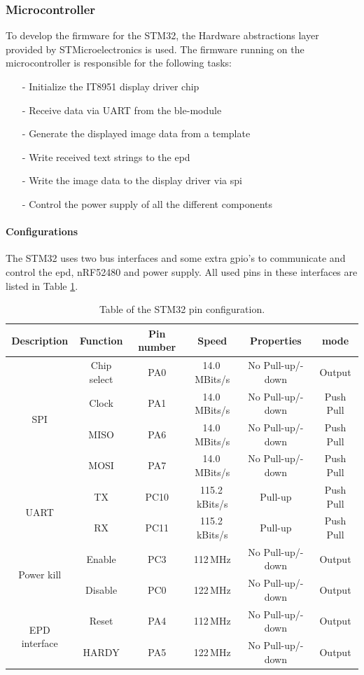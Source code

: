 \subsubsection{Microcontroller}
To develop the firmware for the STM32, the Hardware abstractions layer provided by STMicroelectronics is used. The firmware running on the microcontroller is responsible for the following tasks:
\begin{itemize}[ht]
	\item[-] Initialize the IT8951 display driver chip
	\item[-] Receive data via UART from the \acs{ble}-module
	\item[-] Generate the displayed image data from a template
	\item[-] Write received text strings to the \acs{epd}
	\item[-] Write the image data to the display driver via \acs{spi}
	\item[-] Control the power supply of all the different components
\end{itemize}

\paragraph{Configurations}
The STM32 uses two bus interfaces and some extra \acs{gpio}'s to communicate and control the \acs{epd}, nRF52480 and power supply. All used pins in these interfaces are listed in Table \ref{table:stm32}.  

\begin{table}[ht]
	\begin{tabular}{ |c|c|c|c|c|c| } 
		\hline
	Description & Function &Pin number & Speed& Properties& mode \\
		\hline
	\multirow{4}{4em}{SPI} 	& Chip select & PA0&14.0\,MBits/s &No Pull-up/-down& Output \\ 
								& Clock& PA1 & 14.0\,MBits/s&No Pull-up/-down& Push Pull \\ 
								& MISO & PA6&14.0\,MBits/s & No Pull-up/-down& Push Pull  \\ 
								& MOSI & PA7& 14.0\,MBits/s&No Pull-up/-down& Push Pull  \\ 
		\hline
	\multirow{2}{4em}{UART} & TX & PC10 & 115.2\,kBits/s & Pull-up& Push Pull   \\ 
								& RX & PC11 & 115.2\,kBits/s & Pull-up& Push Pull \\ 
	\hline
	
	\multirow{2}{4em}{Power kill} & Enable & PC3 & 112\,MHz &No Pull-up/-down& Output   \\ 
										  & Disable& PC0 & 122\,MHz &No Pull-up/-down& Output \\ 
	\hline
	
	\multirow{2}{4em}{EPD interface} & Reset & PA4 & 112\,MHz &No Pull-up/-down& Output   \\ 
									& HARDY& PA5 & 122\,MHz &No Pull-up/-down& Output \\ 
	\hline

	\end{tabular}
	\caption{Table of the STM32 pin configuration.\label{table:stm32}}
\end{table}

